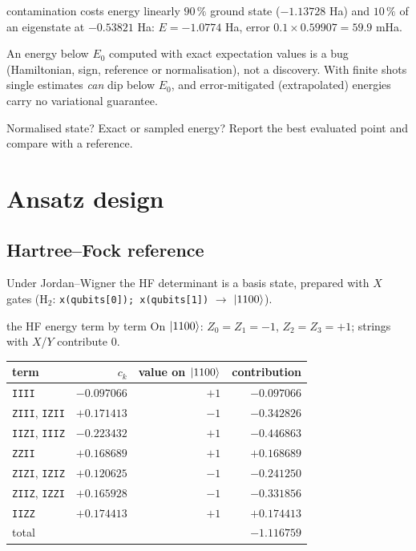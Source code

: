 \documentclass[11pt,a4paper,openany]{book}
\newcounter{wex}[chapter]
\begin{document}
\begin{wexample}{contamination costs energy linearly}
$90\,\%$ ground state ($-1.13728$ Ha) and $10\,\%$ of an eigenstate at $-0.53821$ Ha: $E = -1.0774$ Ha, error $0.1\times0.59907 = 59.9$ mHa.
\end{wexample}
\begin{trap}
An energy below $E_0$ computed with exact expectation values is a bug (Hamiltonian, sign, reference or normalisation), not a discovery. With
finite shots single estimates \emph{can} dip below $E_0$, and error-mitigated (extrapolated) energies carry no variational guarantee.
\end{trap}
\begin{checklist}
Normalised state? Exact or sampled energy? Report the best evaluated point and compare with a reference.
\end{checklist}

\section{Ansatz design}
\subsection{Hartree--Fock reference}
Under Jordan--Wigner the HF determinant is a basis state, prepared with $X$ gates (H$_2$: \texttt{x(qubits[0]); x(qubits[1])} $\to$ $\ket{1100}$).
\begin{wexample}{the HF energy term by term}
On $\ket{1100}$: $Z_0 = Z_1 = -1$, $Z_2 = Z_3 = +1$; strings with $X$/$Y$ contribute $0$.
\begin{center}\small
\begin{tabular}{lrrr}
\toprule term & $c_k$ & value on $\ket{1100}$ & contribution\\ \midrule
\texttt{IIII} & $-0.097066$ & $+1$ & $-0.097066$\\
\texttt{ZIII}, \texttt{IZII} & $+0.171413$ & $-1$ & $-0.342826$\\
\texttt{IIZI}, \texttt{IIIZ} & $-0.223432$ & $+1$ & $-0.446863$\\
\texttt{ZZII} & $+0.168689$ & $+1$ & $+0.168689$\\
\texttt{ZIZI}, \texttt{IZIZ} & $+0.120625$ & $-1$ & $-0.241250$\\
\texttt{ZIIZ}, \texttt{IZZI} & $+0.165928$ & $-1$ & $-0.331856$\\
\texttt{IIZZ} & $+0.174413$ & $+1$ & $+0.174413$\\ \midrule
total & & & $-1.116759$\\ \bottomrule
\end{tabular}
\end{center}
\end{wexample}
\end{document}
